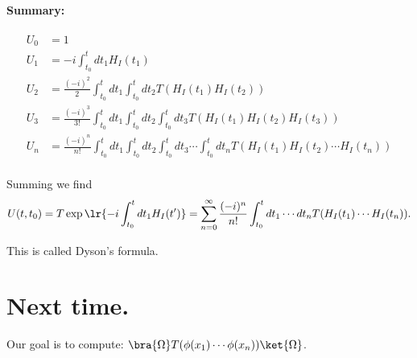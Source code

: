 \paragraph{Summary:}
\begin{dmath}\label{eqn:qftLecture13:1120}
\begin{aligned}
U_0 &= 1 \\
U_1 &= -i \int_{t_0}^t dt_1 H_I(t_1) \\
U_2 &= \frac{(-i)^2}{2}
\int_{t_0}^t dt_1
\int_{t_0}^t dt_2
T( H_I(t_1)
H_I(t_2) ) \\
U_3 &= \frac{(-i)^3}{3!}
\int_{t_0}^t dt_1
\int_{t_0}^t dt_2
\int_{t_0}^t dt_3
T( H_I(t_1)
H_I(t_2)
H_I(t_3)
) \\
U_n &= \frac{(-i)^n}{n!}
\int_{t_0}^t dt_1
\int_{t_0}^t dt_2
\int_{t_0}^t dt_3
\cdots
\int_{t_0}^t dt_n
T( H_I(t_1)
H_I(t_2)
\cdots
H_I(t_n)
) \\
\end{aligned}
\end{dmath}

Summing we find
\begin{dmath}\label{eqn:qftLecture13:1140}
U(t, t_0) = T \exp\lr{-i
\int_{t_0}^t dt_1 H_I(t')
}
=
\sum_{n = 0}^\infty
\frac{(-i)^n}{n!} \int_{t_0}^t dt_1 \cdots dt_n T( H_I(t_1) \cdots H_I(t_n) ).
\end{dmath}

This is called Dyson's formula.

\section{Next time.}

Our goal is to compute: \( \bra{\Omega} T(\phi(x_1) \cdots \phi(x_n)) \ket{\Omega} \).

